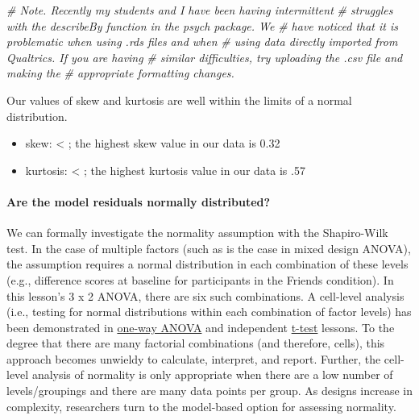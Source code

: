 \documentclass[
  11pt,
]{book}
\newenvironment{Shaded}{\begin{snugshade}}{\end{snugshade}}
\newcommand{\CommentTok}[1]{\textcolor[rgb]{0.37,0.37,0.37}{\textit{#1}}}
\providecommand{\tightlist}{%
  \setlength{\itemsep}{0pt}\setlength{\parskip}{0pt}}
\begin{document}
\begin{Shaded}
\begin{Highlighting}[]
\CommentTok{\# Note. Recently my students and I have been having intermittent}
\CommentTok{\# struggles with the describeBy function in the psych package. We}
\CommentTok{\# have noticed that it is problematic when using .rds files and when}
\CommentTok{\# using data directly imported from Qualtrics. If you are having}
\CommentTok{\# similar difficulties, try uploading the .csv file and making the}
\CommentTok{\# appropriate formatting changes.}
\end{Highlighting}
\end{Shaded}

Our values of skew and kurtosis are well within the limits \citep{kline_data_2016} of a normal distribution.

\begin{itemize}
\tightlist
\item
  skew: \textless{} \textbar; the highest skew value in our data is 0.32
\item
  kurtosis: \textless{} \textbar; the highest kurtosis value in our data is \textbar.57\textbar{}
\end{itemize}

\hypertarget{are-the-model-residuals-normally-distributed-1}{%
\paragraph{Are the model residuals normally distributed?}\label{are-the-model-residuals-normally-distributed-1}}

We can formally investigate the normality assumption with the Shapiro-Wilk test. In the case of multiple factors (such as is the case in mixed design ANOVA), the assumption requires a normal distribution in each combination of these levels (e.g., difference scores at baseline for participants in the Friends condition). In this lesson's 3 x 2 ANOVA, there are six such combinations. A cell-level analysis (i.e., testing for normal distributions within each combination of factor levels) has been demonstrated in \protect\hyperlink{oneway}{one-way ANOVA} and independent \protect\hyperlink{tIndSample}{t-test} lessons. To the degree that there are many factorial combinations (and therefore, cells), this approach becomes unwieldy to calculate, interpret, and report. Further, the cell-level analysis of normality is only appropriate when there are a low number of levels/groupings and there are many data points per group. As designs increase in complexity, researchers turn to the model-based option for assessing normality.
\end{document}
